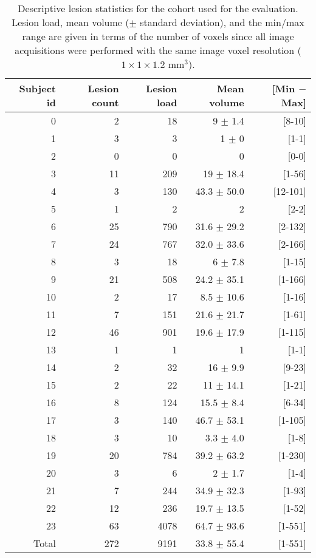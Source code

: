 \begin{table}[!htb]
  \centering
  \begin{tabular*}{1.0\textwidth}{@{\extracolsep{\fill}} rrrrr}
    \textbf{Subject id} & \textbf{Lesion count} & \textbf{Lesion load} & \textbf{Mean volume} & \textbf{[Min $-$ Max]} \\
    \toprule
    \midrule
    0 & 2 & 18 & 9 $\pm$ 1.4 & [8-10] \\
    1 & 3 & 3 & 1 $\pm$ 0 & [1-1] \\
    2 & 0 & 0 & 0 & [0-0] \\
    3 & 11 & 209 & 19 $\pm$ 18.4 & [1-56] \\
    4 & 3 & 130 & 43.3 $\pm$ 50.0 & [12-101] \\
    5 & 1 & 2 & 2 & [2-2] \\
    6 & 25 & 790 & 31.6 $\pm$ 29.2 & [2-132] \\
    7 & 24 & 767 & 32.0 $\pm$ 33.6 & [2-166] \\
    8 & 3 & 18 & 6 $\pm$ 7.8 & [1-15] \\
    9 & 21 & 508 & 24.2 $\pm$ 35.1 & [1-166] \\
    10 & 2 & 17 & 8.5 $\pm$ 10.6 & [1-16] \\
    11 & 7 & 151 & 21.6 $\pm$ 21.7 & [1-61] \\
    12 & 46 & 901 & 19.6 $\pm$ 17.9 & [1-115] \\
    13 & 1 & 1 & 1 & [1-1] \\
    14 & 2 & 32 & 16 $\pm$ 9.9 & [9-23] \\
    15 & 2 & 22 & 11 $\pm$ 14.1 & [1-21] \\
    16 & 8 & 124 & 15.5 $\pm$ 8.4 & [6-34] \\
    17 & 3 & 140 & 46.7 $\pm$ 53.1 & [1-105] \\
    18 & 3 & 10 & 3.3 $\pm$ 4.0 & [1-8] \\
    19 & 20 & 784 & 39.2 $\pm$ 63.2 & [1-230] \\
    20 & 3 & 6 & 2 $\pm$ 1.7 & [1-4] \\
    21 & 7 & 244 & 34.9 $\pm$ 32.3 & [1-93] \\
    22 & 12 & 236 & 19.7 $\pm$ 13.5 & [1-52] \\
    23 & 63 & 4078 & 64.7 $\pm$ 93.6 & [1-551] \\
    \midrule
    Total & 272 & 9191 & 33.8 $\pm$ 55.4 & [1-551] \\
    \midrule
    \bottomrule
  \end{tabular*}
\label{table:trainingData}
\caption{Descriptive lesion statistics for the cohort used for the evaluation.
         Lesion load, mean volume ($\pm$ standard deviation), and the min/max range are given in terms of
         the number of voxels
         since all image acquisitions were performed with the same image
         voxel resolution ($1\times1\times1.2$ mm$^3$).
         }
\end{table}
